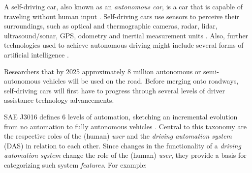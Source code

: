 A self-driving car, also known as an \textit{autonomous car}, is a car that is capable of traveling without human input \cite{Xie}.
Self-driving cars use sensors to perceive their surroundings, such as optical and thermographic cameras, radar, lidar, ultrasound/sonar, GPS, odometry and inertial measurement units \cite{Xie2}.
Also, further technologies used to achieve autonomous driving might include several forms of artificial intelligence \cite{atakishiyev2023explainable}.

Researchers  that by 2025 approximately 8 million autonomous or semi-autonomous vehicles will be used on the road.
Before merging onto roadways, self-driving cars will first have to progress through several levels of driver assistance technology advancements.

SAE J3016 defines 6 levels of automation, sketching an incremental evolution from no automation to fully autonomous vehicles \cite{Serban2020}. 
Central to this taxonomy are the respective roles of the (human) \textit{user} and the \textit{driving automation system} (DAS) in relation to each other.
Since changes in the functionality of a \textit{driving automation system} change the role of the (human) \textit{user}, they provide a basis for categorizing such system \textit{features}. 
For example:

